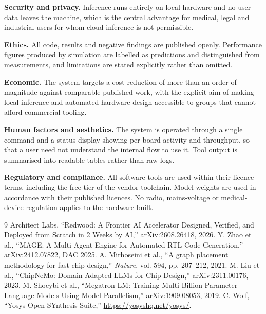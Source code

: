 \documentclass[conference,10pt]{IEEEtran}
\begin{document}
\textbf{Security and privacy.} Inference runs entirely on local hardware and no
user data leaves the machine, which is the central advantage for medical, legal and
industrial users for whom cloud inference is not permissible.

\textbf{Ethics.} All code, results and negative findings are published openly.
Performance figures produced by simulation are labelled as predictions and
distinguished from measurements, and limitations are stated explicitly rather than
omitted.

\textbf{Economic.} The system targets a cost reduction of more than an order of
magnitude against comparable published work, with the explicit aim of making local
inference and automated hardware design accessible to groups that cannot afford
commercial tooling.

\textbf{Human factors and aesthetics.} The system is operated through a single
command and a status display showing per-board activity and throughput, so that a
user need not understand the internal flow to use it. Tool output is summarised
into readable tables rather than raw logs.

\textbf{Regulatory and compliance.} All software tools are used within their
licence terms, including the free tier of the vendor toolchain. Model weights are
used in accordance with their published licences. No radio, mains-voltage or
medical-device regulation applies to the hardware built.

\begin{thebibliography}{9}
 Architect Labs, ``Redwood: A Frontier AI Accelerator Designed,
Verified, and Deployed from Scratch in 2 Weeks by AI,'' arXiv:2608.26418, 2026.
 Y. Zhao et al., ``MAGE: A Multi-Agent Engine for Automated RTL Code
Generation,'' arXiv:2412.07822, DAC 2025.
 A. Mirhoseini et al., ``A graph placement methodology for fast
chip design,'' \emph{Nature}, vol. 594, pp. 207--212, 2021.
 M. Liu et al., ``ChipNeMo: Domain-Adapted LLMs for Chip Design,''
arXiv:2311.00176, 2023.
 M. Shoeybi et al., ``Megatron-LM: Training Multi-Billion
Parameter Language Models Using Model Parallelism,'' arXiv:1909.08053, 2019.
 C. Wolf, ``Yosys Open SYnthesis Suite,'' \url{https://yosyshq.net/yosys/}.
\end{thebibliography}
\end{document}
